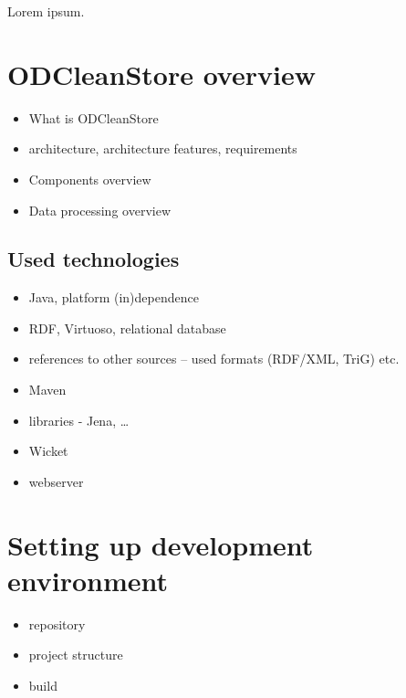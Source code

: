 
\newcommand{\version}{0.1}
\newcommand{\documentname}{Programmer's Guide}






\renewcommand{\contentsname}{Contents}
\tableofcontents
\bigskip

\newpage


Lorem ipsum.

\chapter{ODCleanStore overview} 

\begin{itemize}
	\item What is ODCleanStore
	\item architecture, architecture features, requirements
	\item Components overview
	\item Data processing overview
\end{itemize}

\section{Used technologies}

\begin{itemize}
	\item Java, platform (in)dependence
	\item RDF, Virtuoso, relational database
	\item references to other sources -- used formats (RDF/XML, TriG) etc.
	\item Maven
	\item libraries - Jena, \ldots
	\item Wicket
	\item webserver
\end{itemize}

\chapter{Setting up development environment}

\begin{itemize}
	\item repository
	\item project structure
	\item build
\end{itemize}

